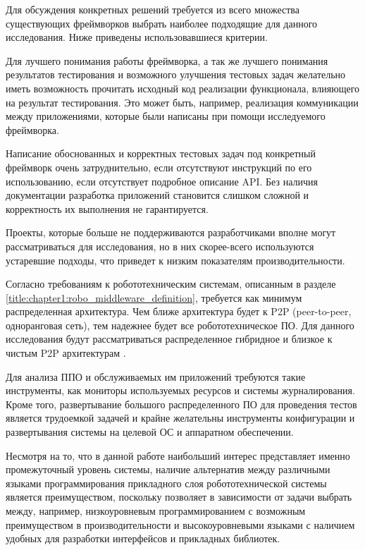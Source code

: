 Для обсуждения конкретных решений требуется из всего множества существующих фреймворков выбрать наиболее подходящие для данного исследования. Ниже приведены использовавшиеся критерии.

\begin{description}[noitemsep]
	\item [Наличие открытого исходного кода.] Для лучшего понимания работы фреймворка, а так же лучшего понимания результатов тестирования и возможного улучшения тестовых задач желательно иметь возможность прочитать исходный код реализации функционала, влияющего на результат тестирования. Это может быть, например, реализация коммуникации между приложениями, которые были написаны при помощи исследуемого фреймворка.
	
	\item [Наличие документации.] Написание обоснованных и корректных тестовых задач под конкретный фреймворк очень затруднительно, если отсутствуют инструкций по его использованию, если отсутствует подробное описание API. Без наличия документации разработка приложений становится слишком сложной и корректность их выполнения не гарантируется.
	
	\item [Текущий статус разработки.] Проекты, которые больше не поддерживаются разработчиками вполне могут рассматриваться для исследования, но в них скорее-всего используются устаревшие подходы, что приведет к низким показателям производительности.
	
	\item[Архитектура фреймворка.] Согласно требованиям к робототехническим системам, описанным в разделе \ref{title:chapter1:robo_middleware_definition}, требуется как минимум распределенная архитектура. Чем ближе архитектура будет к P2P (peer-to-peer, одноранговая сеть), тем надежнее будет все робототехническое ПО. Для данного исследования будут рассматриваться распределенное гибридное и близкое к чистым P2P архитектурам \marm{}.
	
	\item [Наличие инструментов для мониторинга и конфигурации системы.] Для анализа ППО и обслуживаемых им приложений требуются такие инструменты, как мониторы используемых ресурсов и системы журналирования. Кроме того, развертывание большого распределенного ПО для проведения тестов является трудоемкой задачей и крайне желательны инструменты конфигурации и развертывания системы на целевой ОС и аппаратном обеспечении.
	
	\item [Поддержка различных языков программирования.] Несмотря на то, что в данной работе наибольший интерес представляет именно промежуточный уровень системы, наличие альтернатив между различными языками программирования прикладного слоя робототехнической системы является преимуществом, поскольку позволяет в зависимости от задачи выбрать между, например, низкоуровневым программированием с возможным преимуществом в производительности и высокоуровневыми языками с наличием удобных для разработки интерфейсов и прикладных библиотек.
	
\end{description}


